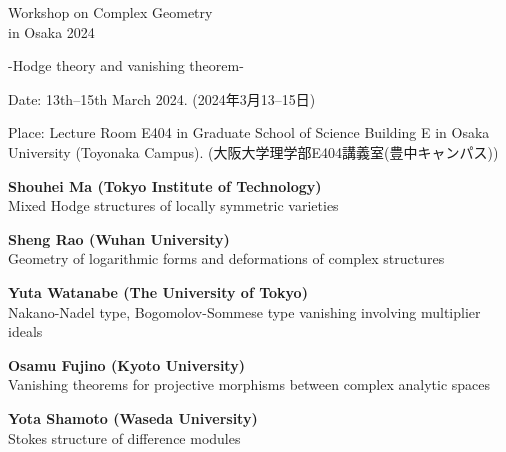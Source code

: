 \documentclass[dvipdfmx,a4paper,12pt]{article}
\theoremstyle{plain} %
\theoremstyle{definition} %
\begin{document}
\begin{center}
  {\Huge Workshop on Complex Geometry \\ in Osaka 2024}
 
  {\Large -Hodge theory and vanishing theorem-}
  \end{center}
  
\vskip5mm
\begin{flushleft}
{ Date: 13th--15th March 2024. (2024年3月13--15日)}


{Place: Lecture Room E404 in Graduate School of Science Building E in Osaka University (Toyonaka Campus).}
{(大阪大学理学部E404講義室(豊中キャンパス))}

\end{flushleft}




\vskip8mm
\vskip3mm

\vskip1mm
{\bf Shouhei Ma (Tokyo Institute of Technology)}\\
Mixed Hodge structures of locally symmetric varieties
\vskip3mm

 {\bf Sheng Rao (Wuhan University)}\\
Geometry of logarithmic forms and deformations of complex structures
\vskip3mm

{\bf Yuta Watanabe (The University of Tokyo)}\\
Nakano-Nadel type, Bogomolov-Sommese type vanishing involving multiplier ideals

\vskip5mm

\vskip1mm
{\bf Osamu Fujino (Kyoto University) }\\
Vanishing theorems for projective morphisms between complex analytic spaces 

\vskip3mm
{\bf Yota Shamoto (Waseda University) }\\
Stokes structure of difference modules
\end{document}
